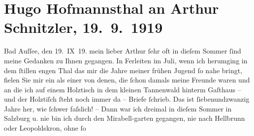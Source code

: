 

         
         \renewcommand{\erwaehntePersonen}{Personen: Frieda Pollak, Franz Schalk, Richard Strauss}
         \renewcommand{\erwaehnteOrte}{Orte: Bad Aussee, Ferleiten, Hellbrunn, Mirabell, Oper, Salzburg, Salzburg-Leopoldskron, Wien}
         \renewcommand{\erwaehnteWerke}{Werke: Die Frau ohne Schatten. Erzählung, Palestrina. Musikalische Legende in drei Akten}
               \section[Hugo Hofmannsthal an Arthur Schnitzler, 19. 9. 1919]{ Hugo Hofmannsthal an Arthur Schnitzler, 19. 9. 1919}\nopagebreak{}\rehead{ }\begin{ledgroupsized}[t]{13cm}\normalsize\beginnumbering \toendnotes[C]{\smallbreak\pagebreak[2]} 
\toendnotes[C]{\smallbreak}\pstart
           {\pb}Bad Auſſee, den
                  19. IX 19.\pend
           \pstart{}mein lieber Arthur\pend\pstart
           ſehr oft in dieſem Sommer ſind meine Gedanken zu Ihnen gegangen. In Ferleiten im Juli, wenn ich
               herumging in dem ſtillen engen Thal das mir die Jahre meiner frühen Jugend ſo nahe
               bringt, fielen Sie mir ein als einer von denen, die ſchon damals meine Freunde waren
               und an die ich auf einem Holztisch in dem kleinen Tannenwald hinterm Gaſthaus – und
               der Holztiſch ſteht noch immer da – Briefe ſchrieb. Das ist ſiebenundzwanzig Jahre
               her, wie ſchwer faſslich! – Dann war ich dreimal in dieſem Sommer in Salzburg u. nie bin ich durch den Mirabell-garten gegangen, nie nach Hellbrunn oder Leopoldskron, ohne ſo

\end{ledgroupsized}
